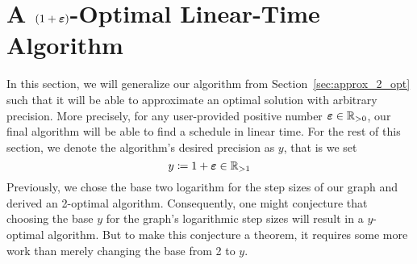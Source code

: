 \section{A $(1+\boldsymbol\varepsilon)$-Optimal Linear-Time Algorithm}
In this section, we will generalize our algorithm from Section~\ref{sec:approx_2_opt} such that it will be able to approximate an optimal solution with arbitrary precision. More precisely, for any user-provided positive number $\boldsymbol\varepsilon\in\mathbb{R}_{>0}$, our final algorithm will be able to find a  schedule in linear time.
For the rest of this section, we denote the algorithm's desired precision as $y$, that is we set
\begin{equation*}
	y\coloneqq 1+\boldsymbol\varepsilon\in\mathbb{R}_{>1}
\end{equation*}
Previously, we chose the base two logarithm for the step sizes of our graph and derived an 2-optimal algorithm. Consequently, one might conjecture that choosing the base $y$ for the graph's logarithmic step sizes will result in a $y$-optimal algorithm. But to make this conjecture a theorem, it requires some more work than merely changing the base from 2 to $y$.

